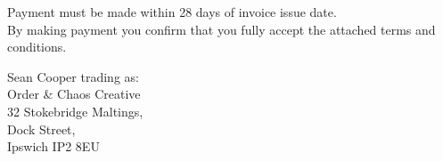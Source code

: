 \documentclass[11pt,a4paper]{letter}
\begin{document}
    \fontsize{9pt}{11pt}\selectfont
    {\semibold Payment must be made within 28 days of invoice issue date.}\\
    By making payment you confirm that you fully accept the attached terms and conditions.\par
    \vspace*{\fill}
    \begin{center}
    {\fontsize{8pt}{10pt}\selectfont
    Sean Cooper trading as:\\
    {\semiboldit Order \& Chaos Creative}\\
    32 Stokebridge Maltings,\\
    Dock Street,\\
    Ipswich IP2 8EU\\}
    \end{center}
\end{document}
